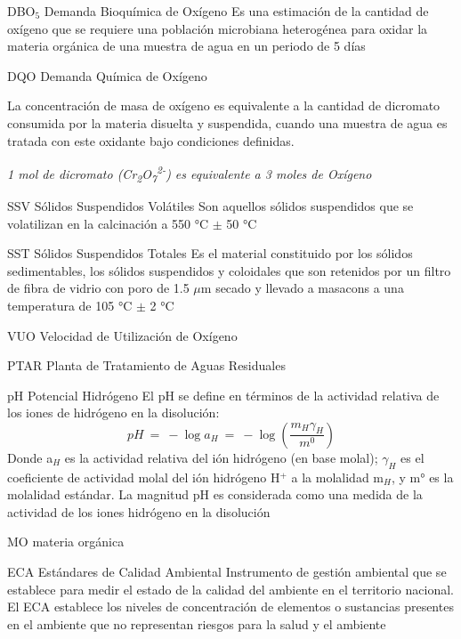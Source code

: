 	{DBO$_{5}$}            %
	{Demanda Bioquímica de Oxígeno}  %
	{Es una estimación de la cantidad de oxígeno que se requiere una población microbiana heterogénea para oxidar la materia orgánica de una muestra de agua en un periodo de 5 días} %

	{DQO}
	{Demanda Química de Oxígeno}
	{La concentración de masa de oxígeno es equivalente a la cantidad de dicromato consumida por la materia disuelta y suspendida, cuando una muestra de agua es tratada con este oxidante bajo condiciones definidas.
		\begin{center}
			\emph{1 mol de dicromato (Cr\textsubscript{2}O\textsubscript{7}\textsuperscript{2-}) es equivalente a 3 moles de Oxígeno}
		\end{center}
	}

	{SSV}
	{Sólidos Suspendidos Volátiles}
	{Son aquellos sólidos suspendidos que se volatilizan en la calcinación a 550 °C $\pm$ 50 °C}

	{SST}
	{Sólidos Suspendidos Totales}
	{Es el material constituido por los sólidos sedimentables, los sólidos suspendidos y coloidales que son retenidos por un filtro de fibra de vidrio con poro de 1.5 $\mu$m secado y llevado a \gls{masacons} a una temperatura de 105 °C $\pm$ 2 °C}

	{VUO}
	{Velocidad de Utilización de Oxígeno}
	{}

	{PTAR}
	{Planta de Tratamiento de Aguas Residuales}
	{}

	{pH}
	{Potencial Hidrógeno}
	{El pH se define en términos de la actividad relativa de los iones de hidrógeno en la disolución:
		$$pH\ =\ -\log a_{H}\ =\ -\log (\frac{m_{H}\gamma_{H}}{m^{0}})$$
	Donde a$_{H}$ es la actividad relativa del ión hidrógeno (en base molal); $\gamma_{H}$ es el coeficiente de actividad molal del ión hidrógeno H$^{+}$ a la molalidad m$_{H}$, y m° es la molalidad estándar. La magnitud pH es considerada como una medida de la actividad de los iones hidrógeno en la disolución}

	{MO}
	{materia orgánica}
	{}

	{ECA}
	{Estándares de Calidad Ambiental}
	{Instrumento de gestión ambiental que se establece para medir el estado de la calidad del ambiente en el territorio nacional. El ECA establece los niveles de concentración de elementos o sustancias presentes en el ambiente que no representan riesgos para la salud y el ambiente}


